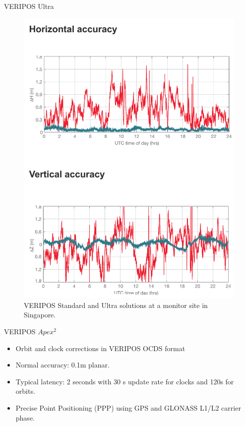 \documentclass[12pt]{beamer}
\begin{document}
\begin{frame}[plain]{VERIPOS Ultra}
	
	\begin{figure}
		
		\includegraphics[height=0.8\textheight]{pic/Ultra.png}
		\caption{VERIPOS Standard and Ultra solutions at a monitor site in Singapore.}
	\end{figure}
	
\end{frame}

\begin{frame}{VERIPOS $Apex^2$}
	
	\begin{itemize}	
		\item Orbit and clock corrections in VERIPOS OCDS format
		\item Normal accuracy: 0.1m planar. 
		\item Typical latency: 2 seconds with 30 s update rate for clocks and 120s for orbits.
		\item Precise Point Positioning (PPP) using GPS and GLONASS L1/L2 carrier phase.
	\end{itemize}	


	
\end{frame}	
\end{document}
